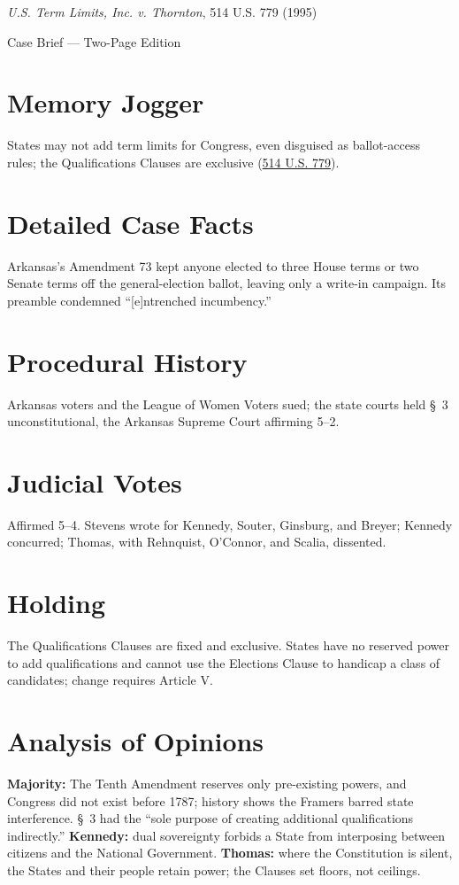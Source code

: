 \documentclass[12pt]{article}
\begin{document}
\begin{center}
{\LARGE \textit{U.S. Term Limits, Inc. v. Thornton}, 514 U.S. 779 (1995)\par}
\vspace{0.5em}
{\large Case Brief --- Two-Page Edition\par}
\end{center}

\section{Memory Jogger}
States may not add term limits for Congress, even disguised as ballot-access rules; the Qualifications Clauses are exclusive (\href{https://supreme.justia.com/cases/federal/us/514/779/}{514 U.S. 779}).

\section{Detailed Case Facts}
Arkansas's Amendment 73 kept anyone elected to three House terms or two Senate terms off the general-election ballot, leaving only a write-in campaign. Its preamble condemned ``[e]ntrenched incumbency.''

\section{Procedural History}
Arkansas voters and the League of Women Voters sued; the state courts held \S~3 unconstitutional, the Arkansas Supreme Court affirming 5--2.

\section{Judicial Votes}
Affirmed 5--4. Stevens wrote for Kennedy, Souter, Ginsburg, and Breyer; Kennedy concurred; Thomas, with Rehnquist, O'Connor, and Scalia, dissented.

\section{Holding}
The Qualifications Clauses are fixed and exclusive. States have no reserved power to add qualifications and cannot use the Elections Clause to handicap a class of candidates; change requires Article V.

\section{Analysis of Opinions}
\textbf{Majority:} The Tenth Amendment reserves only pre-existing powers, and Congress did not exist before 1787; history shows the Framers barred state interference. \S~3 had the ``sole purpose of creating additional qualifications indirectly.'' \textbf{Kennedy:} dual sovereignty forbids a State from interposing between citizens and the National Government. \textbf{Thomas:} where the Constitution is silent, the States and their people retain power; the Clauses set floors, not ceilings.
\end{document}
